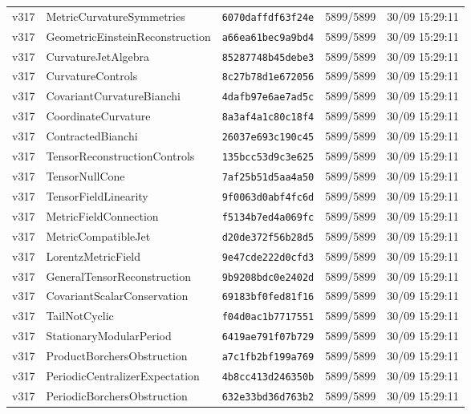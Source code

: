 \documentclass[11pt]{article}
\theoremstyle{definition}\newtheorem{deriv}{Derivation}
\begin{document}
{\begin{longtable}{@{}lllll@{}}
v317 & MetricCurvatureSymmetries & \texttt{6070daffdf63f24e} & 5899/5899 & 30/09 15:29:11 \\
v317 & GeometricEinsteinReconstruction & \texttt{a66ea61bec9a9bd4} & 5899/5899 & 30/09 15:29:11 \\
v317 & CurvatureJetAlgebra & \texttt{85287748b45debe3} & 5899/5899 & 30/09 15:29:11 \\
v317 & CurvatureControls & \texttt{8c27b78d1e672056} & 5899/5899 & 30/09 15:29:11 \\
v317 & CovariantCurvatureBianchi & \texttt{4dafb97e6ae7ad5c} & 5899/5899 & 30/09 15:29:11 \\
v317 & CoordinateCurvature & \texttt{8a3af4a1c80c18f4} & 5899/5899 & 30/09 15:29:11 \\
v317 & ContractedBianchi & \texttt{26037e693c190c45} & 5899/5899 & 30/09 15:29:11 \\
v317 & TensorReconstructionControls & \texttt{135bcc53d9c3e625} & 5899/5899 & 30/09 15:29:11 \\
v317 & TensorNullCone & \texttt{7af25b51d5aa4a50} & 5899/5899 & 30/09 15:29:11 \\
v317 & TensorFieldLinearity & \texttt{9f0063d0abf4fc6d} & 5899/5899 & 30/09 15:29:11 \\
v317 & MetricFieldConnection & \texttt{f5134b7ed4a069fc} & 5899/5899 & 30/09 15:29:11 \\
v317 & MetricCompatibleJet & \texttt{d20de372f56b28d5} & 5899/5899 & 30/09 15:29:11 \\
v317 & LorentzMetricField & \texttt{9e47cde222d0cfd3} & 5899/5899 & 30/09 15:29:11 \\
v317 & GeneralTensorReconstruction & \texttt{9b9208bdc0e2402d} & 5899/5899 & 30/09 15:29:11 \\
v317 & CovariantScalarConservation & \texttt{69183bf0fed81f16} & 5899/5899 & 30/09 15:29:11 \\
v317 & TailNotCyclic & \texttt{f04d0ac1b7717551} & 5899/5899 & 30/09 15:29:11 \\
v317 & StationaryModularPeriod & \texttt{6419ae791f07b729} & 5899/5899 & 30/09 15:29:11 \\
v317 & ProductBorchersObstruction & \texttt{a7c1fb2bf199a769} & 5899/5899 & 30/09 15:29:11 \\
v317 & PeriodicCentralizerExpectation & \texttt{4b8cc413d246350b} & 5899/5899 & 30/09 15:29:11 \\
v317 & PeriodicBorchersObstruction & \texttt{632e33bd36d763b2} & 5899/5899 & 30/09 15:29:11 \\

\end{longtable}}
\end{document}
